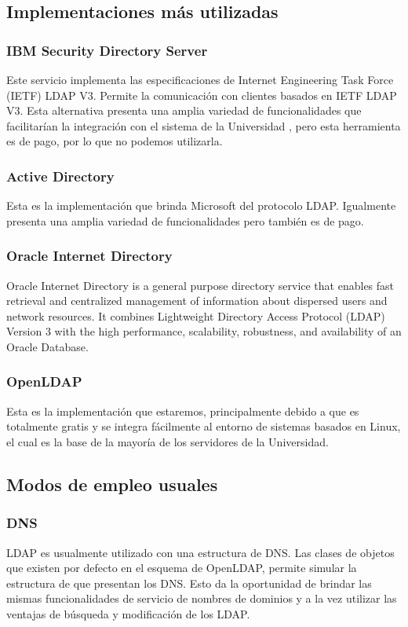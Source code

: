 \subsection{Implementaciones m\'as utilizadas}
\subsubsection{IBM Security Directory Server}
Este servicio implementa las especificaciones de Internet Engineering Task Force (IETF) LDAP V3. Permite la comunicaci\'on con clientes basados en IETF LDAP V3.   Esta alternativa presenta una amplia variedad de funcionalidades que facilitar\'ian la integraci\'on con el sistema de la Universidad , pero esta herramienta es de pago, por lo que no podemos utilizarla.
\subsubsection{Active Directory}
Esta es la implementaci\'on que brinda Microsoft del protocolo LDAP. Igualmente presenta una amplia variedad de funcionalidades pero tambi\'en es de pago.
\subsubsection{Oracle Internet Directory}
Oracle Internet Directory is a general purpose directory service that enables fast retrieval and centralized management of information about dispersed users and network resources. It combines Lightweight Directory Access Protocol (LDAP) Version 3 with the high performance, scalability, robustness, and availability of an Oracle Database. 
\subsubsection{OpenLDAP}
Esta es la implementaci\'on que estaremos, principalmente debido a que es totalmente gratis y se integra f\'acilmente al entorno de sistemas basados en Linux, el cual es la base de la mayor\'ia de los servidores de la Universidad.

\subsection{Modos de empleo usuales}
\subsubsection{DNS}
LDAP es usualmente utilizado con una estructura de DNS. Las clases de objetos que existen por defecto en el esquema de OpenLDAP, permite simular la estructura de que presentan los DNS. Esto da la oportunidad de brindar las mismas funcionalidades de servicio de nombres de dominios y a la vez utilizar las ventajas de b\'usqueda y modificaci\'on de los LDAP.
